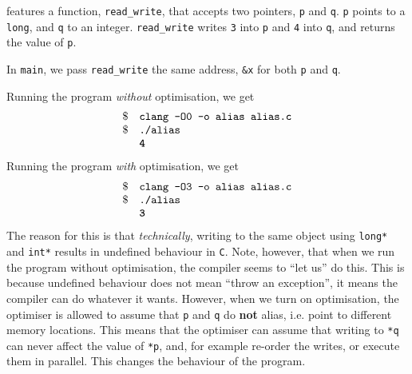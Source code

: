  features a function, \texttt{read\_write}, that accepts two pointers, \texttt{p} and \texttt{q}. \texttt{p} points to a \texttt{long}, and \texttt{q} to an integer. \texttt{read\_write} writes \texttt{3} into \texttt{p} and \texttt{4} into \texttt{q}, and returns the value of \texttt{p}.

In \texttt{main}, we pass \texttt{read\_write} the same address, \texttt{\&x} for both \texttt{p} and \texttt{q}. 

Running the program \textit{without} optimisation, we get
\[\begin{array}{ll}
    \$ & \texttt{clang -O0 -o alias alias.c} \\
    \$ & \texttt{./alias} \\
       & \texttt{\textbf{4}}
\end{array}\]
Running the program \textit{with} optimisation, we get
\[\begin{array}{ll}
    \$ & \texttt{clang -O3 -o alias alias.c} \\
    \$ & \texttt{./alias} \\
       & \texttt{\textbf{3}}
\end{array}\]
The reason for this is that \textit{technically}, writing to the same object using \texttt{long*} and \texttt{int*} results in undefined behaviour in \texttt{C}. Note, however, that when we run the program without optimisation, the compiler seems to ``let us'' do this. This is because undefined behaviour does not mean ``throw an exception'', it means the compiler can do whatever it wants. However, when we turn on optimisation, the optimiser is allowed to assume that \texttt{p} and \texttt{q} do \textbf{not} alias, i.e. point to different memory locations. This means that the optimiser can assume that writing to \texttt{*q} can never affect the value of \texttt{*p}, and, for example re-order the writes, or execute them in parallel. This changes the behaviour of the program. 

